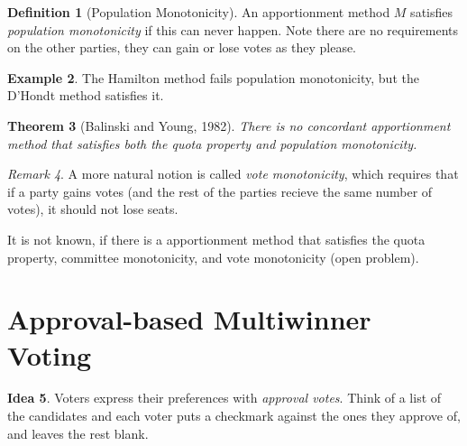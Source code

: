 \documentclass{book}
\theoremstyle{plain}
\newtheorem{theorem}{Theorem}[subsection]
\theoremstyle{definition}
\newtheorem{definition}[theorem]{Definition}
\newtheorem{example}[theorem]{Example}
\newtheorem{idea}[theorem]{Idea}
\theoremstyle{remark}
\newtheorem{remark}[theorem]{Remark}
\newtheorem*{comment}{Comment}
\begin{document}
\begin{definition}[Population Monotonicity]
    An apportionment method $M$ satisfies \emph{population monotonicity} if this can never happen.
    Note there are no requirements on 
    the other parties, they can gain or lose votes as they please.
\end{definition}

\begin{example}
    The Hamilton method fails population monotonicity, but the D'Hondt method satisfies it.
\end{example}

\begin{theorem}[Balinski and Young, 1982]
    There is no concordant apportionment method that satisfies both 
    the quota property and population monotonicity.
\end{theorem}

\begin{remark}
    A more natural notion is called \emph{vote monotonicity}, 
    which requires that if a party gains votes (and the rest of the 
    parties recieve the same number of votes), it should not lose seats.

    It is not known, if there is a 
    apportionment method that satisfies the quota property, committee monotonicity, and vote monotonicity
    (open problem).
\end{remark}

\section{Approval-based Multiwinner Voting}

\begin{idea}
    Voters express their preferences with \emph{approval votes}.
    Think of a list of the candidates and each voter puts a 
    checkmark against the ones they approve of, and 
    leaves the rest blank.
\end{idea}
\end{document}
